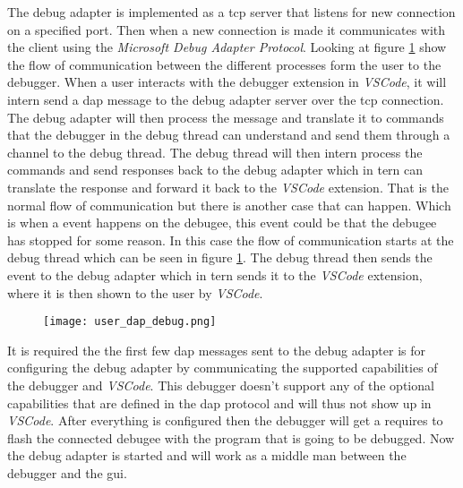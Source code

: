
The debug adapter is implemented as a \gls{tcp} server that listens for new connection on a specified port.
Then when a new connection is made it communicates with the client using the \emph{Microsoft Debug Adapter Protocol}.
Looking at figure \ref{fig:userDAP} show the flow of communication between the different processes form the user to the debugger.
When a user interacts with the debugger extension in \emph{VSCode}, it will intern send a \acrshort{dap} message to the debug adapter server over the \gls{tcp} connection.
The debug adapter will then process the message and translate it to commands that the debugger in the debug thread can understand and send them through a channel to the debug thread.
The debug thread will then intern process the commands and send responses back to the debug adapter which in tern can translate the response and forward it back to the \emph{VSCode} extension.
That is the normal flow of communication but there is another case that can happen.
Which is when a event happens on the debugee, this event could be that the debugee has stopped for some reason.
In this case the flow of communication starts at the debug thread which can be seen in figure \ref{fig:userDAP}.
The debug thread then sends the event to the debug adapter which in tern sends it to the \emph{VSCode} extension, where it is then shown to the user by \emph{VSCode}.


\begin{figure}[h]
    \centering
    \texttt{[image: user\_dap\_debug.png]}
    \label{fig:userDAP}
\end{figure}


It is required the the first few \acrshort{dap} messages sent to the debug adapter is for configuring the debug adapter by communicating the supported capabilities of the debugger and \emph{VSCode}.
This debugger doesn't support any of the optional capabilities that are defined in the \acrshort{dap} protocol and will thus not show up in \emph{VSCode}.
After everything is configured then the debugger will get a requires to flash the connected debugee with the program that is going to be debugged.
Now the debug adapter is started and will work as a middle man between the debugger and the \acrshort{gui}.


